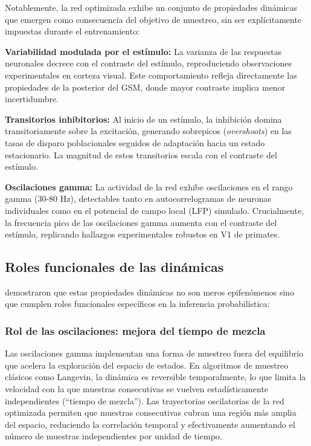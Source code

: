 Notablemente, la red optimizada exhibe un conjunto de propiedades dinámicas que emergen como consecuencia del objetivo de muestreo, sin ser explícitamente impuestas durante el entrenamiento:

\textbf{Variabilidad modulada por el estímulo:} La varianza de las respuestas neuronales decrece con el contraste del estímulo, reproduciendo observaciones experimentales en corteza visual. Este comportamiento refleja directamente las propiedades de la posterior del \acrshort{GSM}, donde mayor contraste implica menor incertidumbre.

\textbf{Transitorios inhibitorios:} Al inicio de un estímulo, la inhibición domina transitoriamente sobre la excitación, generando sobrepicos (\textit{overshoots}) en las tasas de disparo poblacionales seguidos de adaptación hacia un estado estacionario. La magnitud de estos transitorios escala con el contraste del estímulo.

\textbf{Oscilaciones gamma:} La actividad de la red exhibe oscilaciones en el rango gamma (30-80 Hz), detectables tanto en autocorrelogramas de neuronas individuales como en el potencial de campo local (LFP) simulado. Crucialmente, la frecuencia pico de las oscilaciones gamma aumenta con el contraste del estímulo, replicando hallazgos experimentales robustos en V1 de primates.

\subsection{Roles funcionales de las dinámicas}
\label{subsec:echeveste_roles}

\citeauthor{echeveste2020cortical} demostraron que estas propiedades dinámicas no son meros epifenómenos sino que cumplen roles funcionales específicos en la inferencia probabilística:

\subsubsection{Rol de las oscilaciones: mejora del tiempo de mezcla}

Las oscilaciones gamma implementan una forma de muestreo fuera del equilibrio que acelera la exploración del espacio de estados. En algoritmos de muestreo clásicos como Langevin, la dinámica es reversible temporalmente, lo que limita la velocidad con la que muestras consecutivas se vuelven estadísticamente independientes (``tiempo de mezcla''). Las trayectorias oscilatorias de la red optimizada permiten que muestras consecutivas cubran una región más amplia del espacio, reduciendo la correlación temporal y efectivamente aumentando el número de muestras independientes por unidad de tiempo.

